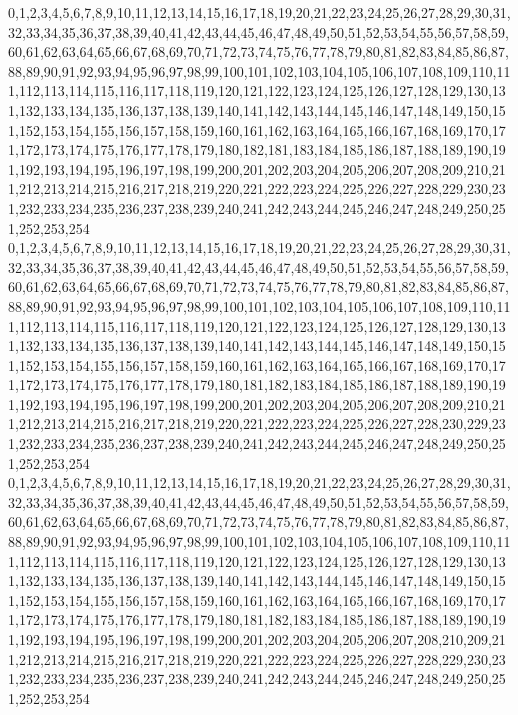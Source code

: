 \documentclass[12pt]{article}
\begin{document}
{0,1,2,3,4,5,6,7,8,9,10,11,12,13,14,15,16,17,18,19,20,21,22,23,24,25,26,27,28,29,30,31,32,33,34,35,36,37,38,39,40,41,42,43,44,45,46,47,48,49,50,51,52,53,54,55,56,57,58,59,60,61,62,63,64,65,66,67,68,69,70,71,72,73,74,75,76,77,78,79,80,81,82,83,84,85,86,87,88,89,90,91,92,93,94,95,96,97,98,99,100,101,102,103,104,105,106,107,108,109,110,111,112,113,114,115,116,117,118,119,120,121,122,123,124,125,126,127,128,129,130,131,132,133,134,135,136,137,138,139,140,141,142,143,144,145,146,147,148,149,150,151,152,153,154,155,156,157,158,159,160,161,162,163,164,165,166,167,168,169,170,171,172,173,174,175,176,177,178,179,180,182,181,183,184,185,186,187,188,189,190,191,192,193,194,195,196,197,198,199,200,201,202,203,204,205,206,207,208,209,210,211,212,213,214,215,216,217,218,219,220,221,222,223,224,225,226,227,228,229,230,231,232,233,234,235,236,237,238,239,240,241,242,243,244,245,246,247,248,249,250,251,252,253,254\\
0,1,2,3,4,5,6,7,8,9,10,11,12,13,14,15,16,17,18,19,20,21,22,23,24,25,26,27,28,29,30,31,32,33,34,35,36,37,38,39,40,41,42,43,44,45,46,47,48,49,50,51,52,53,54,55,56,57,58,59,60,61,62,63,64,65,66,67,68,69,70,71,72,73,74,75,76,77,78,79,80,81,82,83,84,85,86,87,88,89,90,91,92,93,94,95,96,97,98,99,100,101,102,103,104,105,106,107,108,109,110,111,112,113,114,115,116,117,118,119,120,121,122,123,124,125,126,127,128,129,130,131,132,133,134,135,136,137,138,139,140,141,142,143,144,145,146,147,148,149,150,151,152,153,154,155,156,157,158,159,160,161,162,163,164,165,166,167,168,169,170,171,172,173,174,175,176,177,178,179,180,181,182,183,184,185,186,187,188,189,190,191,192,193,194,195,196,197,198,199,200,201,202,203,204,205,206,207,208,209,210,211,212,213,214,215,216,217,218,219,220,221,222,223,224,225,226,227,228,230,229,231,232,233,234,235,236,237,238,239,240,241,242,243,244,245,246,247,248,249,250,251,252,253,254\\
0,1,2,3,4,5,6,7,8,9,10,11,12,13,14,15,16,17,18,19,20,21,22,23,24,25,26,27,28,29,30,31,32,33,34,35,36,37,38,39,40,41,42,43,44,45,46,47,48,49,50,51,52,53,54,55,56,57,58,59,60,61,62,63,64,65,66,67,68,69,70,71,72,73,74,75,76,77,78,79,80,81,82,83,84,85,86,87,88,89,90,91,92,93,94,95,96,97,98,99,100,101,102,103,104,105,106,107,108,109,110,111,112,113,114,115,116,117,118,119,120,121,122,123,124,125,126,127,128,129,130,131,132,133,134,135,136,137,138,139,140,141,142,143,144,145,146,147,148,149,150,151,152,153,154,155,156,157,158,159,160,161,162,163,164,165,166,167,168,169,170,171,172,173,174,175,176,177,178,179,180,181,182,183,184,185,186,187,188,189,190,191,192,193,194,195,196,197,198,199,200,201,202,203,204,205,206,207,208,210,209,211,212,213,214,215,216,217,218,219,220,221,222,223,224,225,226,227,228,229,230,231,232,233,234,235,236,237,238,239,240,241,242,243,244,245,246,247,248,249,250,251,252,253,254\\
}
\end{document}
